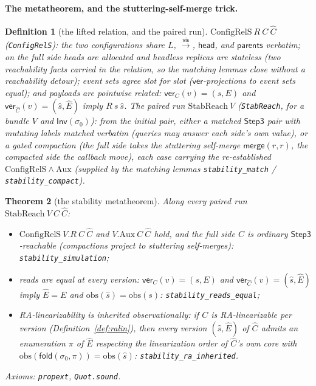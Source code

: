 \documentclass[11pt]{article}
\newtheorem{theorem}{Theorem}[section]
\newtheorem{definition}[theorem]{Definition}
\newcommand{\vis}{\xrightarrow{\mathsf{vis}}}
\newcommand{\Sinit}{\sigma_0}
\newcommand{\lean}[1]{\texttt{#1}}
\newcommand{\fold}{\mathsf{fold}}
\newcommand{\Inv}{\mathsf{Inv}}
\begin{document}
\paragraph{The metatheorem, and the stuttering-self-merge trick.}

\begin{definition}[the lifted relation, and the paired run]
\label{def:stabreach}
$\mathrm{ConfigRelS}\ R\ C\ \hat{C}$ (\lean{ConfigRelS}): the two
configurations share $L$, $\vis$, $\mathsf{head}$, and
$\mathsf{parents}$ verbatim; on the full side heads are allocated and
headless replicas are stateless (two reachability facts carried in the
relation, so the matching lemmas close without a reachability detour);
event sets agree slot for slot
($\mathsf{ver}$-projections to event sets equal); and payloads are
pointwise related: $\mathsf{ver}_C(v) = (s, E)$ and
$\mathsf{ver}_{\hat{C}}(v) = (\hat{s}, \hat{E})$ imply
$R\ s\ \hat{s}$. The \emph{paired run} $\mathrm{StabReach}\ V$
(\lean{StabReach}, for a bundle $V$ and $\Inv(\Sinit)$): from the
initial pair, either a matched $\mathsf{Step3}$ pair with mutating
labels matched verbatim (queries may answer each side's own value), or
a gated compaction (the full side takes the stuttering self-merge
$\mathsf{merge}(r, r)$, the compacted side the callback move), each
case carrying the re-established
$\mathrm{ConfigRelS} \wedge \mathrm{Aux}$ (supplied by the matching
lemmas \lean{stability\_match} / \lean{stability\_compact}).
\end{definition}

\begin{theorem}[the stability metatheorem]
\label{thm:stabsim}
Along every paired run $\mathrm{StabReach}\ V\ C\ \hat{C}$:
\begin{itemize}[leftmargin=2.2em]
\item[(i)] $\mathrm{ConfigRelS}\ V\!.R\ C\ \hat{C}$ and
  $V\!.\mathrm{Aux}\ C\ \hat{C}$ hold, and the full side $C$ is
  ordinary $\mathsf{Step3}$-reachable (compactions project to
  stuttering self-merges): \lean{stability\_simulation};
\item[(ii)] reads are equal at every version: $\mathsf{ver}_C(v) =
  (s, E)$ and $\mathsf{ver}_{\hat{C}}(v) = (\hat{s}, \hat{E})$ imply
  $\hat{E} = E$ and $\mathrm{obs}(\hat{s}) = \mathrm{obs}(s)$:
  \lean{stability\_reads\_equal};
\item[(iii)] RA-linearizability is inherited observationally: if $C$ is
  RA-linearizable per version (Definition~\ref{def:ralin}), then every
  version $(\hat{s}, \hat{E})$ of $\hat{C}$ admits an enumeration $\pi$
  of $\hat{E}$ respecting the linearization order of $\hat{C}$'s
  \emph{own} core with $\mathrm{obs}(\fold(\Sinit, \pi)) =
  \mathrm{obs}(\hat{s})$: \lean{stability\_ra\_inherited}.
\end{itemize}
Axioms: \lean{propext}, \lean{Quot.sound}.
\end{theorem}
\end{document}
